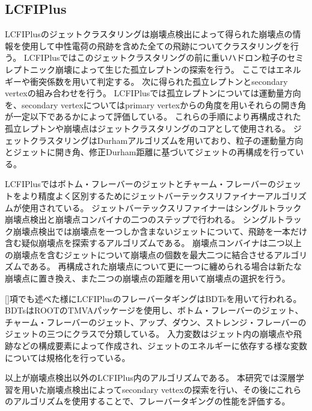 \subsection{LCFIPlus} \label{Com:FlaTagCom:LCFIPlus}

LCFIPlusのジェットクラスタリングは崩壊点検出によって得られた崩壊点の情報を使用して中性電荷の飛跡を含めた全ての飛跡についてクラスタリングを行う。
LCFIPlusではこのジェットクラスタリングの前に重いハドロン粒子のセミレプトニック崩壊によって生じた孤立レプトンの探索を行う。
ここではエネルギーや衝突係数を用いて判定する。
次に得られた孤立レプトンとsecondary vertexの組み合わせを行う。
LCFIPlusでは孤立レプトンについては運動量方向を、secondary vertexについてはprimary vertexからの角度を用いそれらの開き角が一定以下であるかによって評価している。
これらの手順により再構成された孤立レプトンや崩壊点はジェットクラスタリングのコアとして使用される。
ジェットクラスタリングはDurhamアルゴリズムを用いており、粒子の運動量方向とジェットに開き角、修正Durham距離に基づいてジェットの再構成を行っている。

LCFIPlusではボトム・フレーバーのジェットとチャーム・フレーバーのジェットをより精度よく区別するためにジェットバーテックスリファイナーアルゴリズムが使用されている。
ジェットバーテックスリファイナーはシングルトラック崩壊点検出と崩壊点コンバイナの二つのステップで行われる。
シングルトラック崩壊点検出では崩壊点を一つしか含まないジェットについて、飛跡を一本だけ含む疑似崩壊点を探索するアルゴリズムである。
崩壊点コンバイナは二つ以上の崩壊点を含むジェットについて崩壊点の個数を最大二つに結合させるアルゴリズムである。
再構成された崩壊点について更に一つに纏められる場合は新たな崩壊点に置き換え、また二つの崩壊点の距離を用いて崩壊点の選択を行う。

\ref{}項でも述べた様にLCFIPlusのフレーバータギングはBDTsを用いて行われる。
BDTsはROOTのTMVAパッケージを使用し、ボトム・フレーバーのジェット、チャーム・フレーバーのジェット、アップ、ダウン、ストレンジ・フレーバーのジェットの三つにクラスで分類している。
入力変数はジェット内の崩壊点や飛跡などの構成要素によって作成され、ジェットのエネルギーに依存する様な変数については規格化を行っている。

以上が崩壊点検出以外のLCFIPlus内のアルゴリズムである。
本研究では深層学習を用いた崩壊点検出によってsecondary vettexの探索を行い、その後にこれらのアルゴリズムを使用することで、フレーバータギングの性能を評価する。


